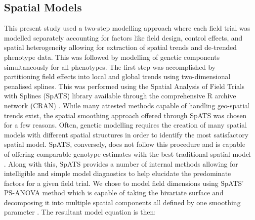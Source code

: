 \begin{refsection}
\begin{table}

\caption{\label{tab:location-table}Agronomic properties of the screening trials conducted in Est and Heelsum}
\centering
{}
\end{table}

\subsection{Spatial Models}

This present study used a two-step modelling approach where each field trial was modelled separately accounting for factors like field design, control effects, and spatial heterogeneity allowing for extraction of spatial trends and de-trended phenotype data. This was followed by modelling of genetic components simultaneously for all phenotypes. The first step was accomplished by partitioning field effects into local and global trends using two-dimensional penalised splines. This was performed using the Spatial Analysis of Field Trials with Splines (SpATS) library available through the comprehensive R archive network (CRAN) \parencite{Rodriguez-Alvarez2018}. While many attested methods capable of handling geo-spatial trends exist, the spatial smoothing approach offered through SpATS was chosen for a few reasons. Often, genetic modelling requires the creation of many spatial models with different spatial structures in order to identify the most satisfactory spatial model. SpATS, conversely, does not follow this procedure and is capable of offering comparable genotype estimates with the best traditional spatial model \parencite{Velazco2017}. Along with this, SpATS provides a number of internal methods allowing for intelligible and simple model diagnostics to help elucidate the predominate factors for a given field trial. We chose to model field dimensions using SpATS' PS-ANOVA method which is capable of taking the bivariate surface and decomposing it into multiple spatial components all defined by one smoothing parameter \parencite{Lee2013}. The resultant model equation is then:


\end{refsection}
